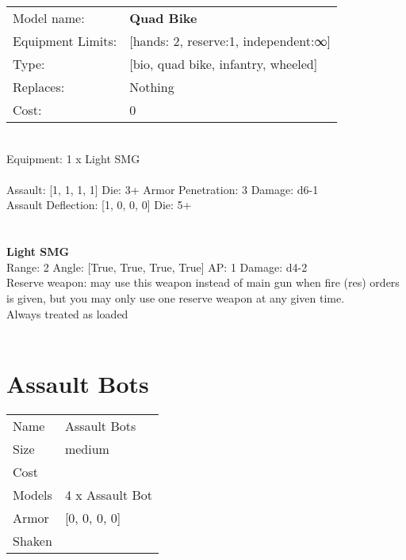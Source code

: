 \noindent
\begin{tabular}{ll}
Model name: &{\bf Quad Bike } \\
Equipment Limits: &[hands: 2, reserve:1, independent:∞] \\
Type: &[bio, quad bike, infantry, wheeled] \\
Replaces: &Nothing \\
Cost: & 0\\
\end{tabular}
\ \\
Equipment: 1 x Light SMG \\
\ \\
Assault: [1, 1, 1, 1] Die: 3+ Armor Penetration: 3 Damage: d6-1 \\
Assault Deflection: [1, 0, 0, 0] Die: 5+\\
\indent  
\ \\

\ \\
{\bf Light SMG } \\



Range: 2  Angle: [True, True, True, True] AP: 1 Damage: d4-2 \\
Reserve weapon: may use this weapon instead of main gun when fire (res) orders is given, but you may only use one reserve weapon at any given time.\\ 
Always treated as loaded\\ 




 
\ \\













\clearpage

\section{ Assault Bots }

\begin{tabular}{ll}
  Name & Assault Bots \\
  Size & medium\\
  Cost & \\
  Models & 4 x Assault Bot\\
  Armor & [0, 0, 0, 0]\\
  Shaken & \\
\end{tabular}

